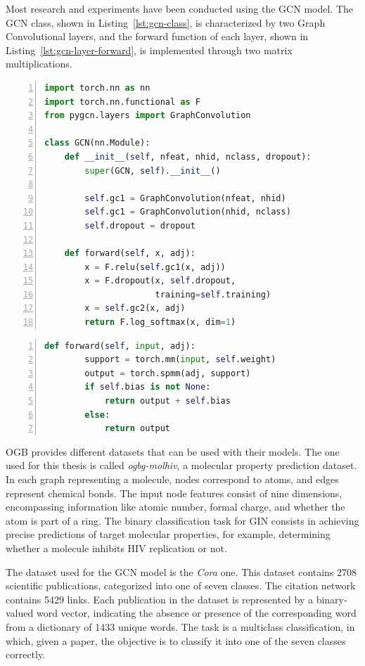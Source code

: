 Most research and experiments have been conducted using the GCN model.
The GCN class, shown in Listing~\ref{lst:gcn-class}, is characterized by two Graph Convolutional layers, and the forward function of each layer, shown in Listing~\ref{lst:gcn-layer-forward}, is implemented through two matrix multiplications.

\begin{lstlisting}[language=Python,label={lst:gcn-class}, numbers=left, xleftmargin=2em, caption=Class of GCN model, float]
import torch.nn as nn
import torch.nn.functional as F
from pygcn.layers import GraphConvolution

class GCN(nn.Module):
    def __init__(self, nfeat, nhid, nclass, dropout):
        super(GCN, self).__init__()

        self.gc1 = GraphConvolution(nfeat, nhid)
        self.gc1 = GraphConvolution(nhid, nclass)
        self.dropout = dropout

    def forward(self, x, adj):
        x = F.relu(self.gc1(x, adj))
        x = F.dropout(x, self.dropout,
                      training=self.training)
        x = self.gc2(x, adj)
        return F.log_softmax(x, dim=1)
\end{lstlisting}


\begin{lstlisting}[language=Python,label={lst:gcn-layer-forward}, numbers=left, xleftmargin=2em, caption=Forward function of GCN layer, float]
    def forward(self, input, adj):
        support = torch.mm(input, self.weight)
        output = torch.spmm(adj, support)
        if self.bias is not None:
            return output + self.bias
        else:
            return output
\end{lstlisting}

OGB provides different datasets that can be used with their models.
The one used for this thesis is called \textit{ogbg-molhiv}, a molecular property prediction dataset.
In each graph representing a molecule, nodes correspond to atoms, and edges represent chemical bonds.
The input node features consist of nine dimensions, encompassing information like atomic number, formal charge, and whether the atom is part of a ring.
The binary classification task for GIN consists in achieving precise predictions of target molecular properties, for example, determining whether a molecule inhibits HIV replication or not.

The dataset used for the GCN model is the \textit{Cora} one.
This dataset contains 2708 scientific publications, categorized into one of seven classes.
The citation network contains 5429 links.
Each publication in the dataset is represented by a binary-valued word vector, indicating the absence or presence of the corresponding word from a dictionary of 1433 unique words.
The task is a multiclass classification, in which, given a paper, the objective is to classify it into one of the seven classes correctly.

